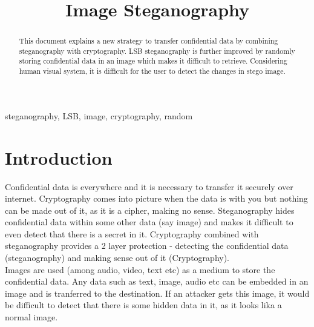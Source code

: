 \documentclass[conference]{IEEEtran}
\begin{document}
\title{Image Steganography\\
}

\author{
}

\maketitle

\begin{abstract}
This document explains a new strategy to transfer confidential data by combining steganography with cryptography.
LSB steganography is further improved by randomly storing confidential data in an image which makes it difficult to retrieve.
Considering human visual system, it is difficult for the user to detect the changes in stego image. \\
\end{abstract} 

\begin{IEEEkeywords}
steganography, LSB, image, cryptography, random
\end{IEEEkeywords}

\section{Introduction}
Confidential data is everywhere and it is necessary to transfer it securely over internet.
Cryptography comes into picture when the data is with you but nothing can be made out of it, as it is a cipher, making no sense.
Steganography hides confidential data within some other data (say image) and makes it difficult to even detect that there is a secret in it.
Cryptography combined with steganography provides a 2 layer protection - detecting the confidential data (steganography) and making sense out of it (Cryptography).\\

Images are used (among audio, video, text etc) as a medium to store the confidential data.
Any data such as text, image, audio etc can be embedded in an image and is tranferred to the destination.
If an attacker gets this image, it would be difficult to detect that there is some hidden data in it, as it looks lika a normal image.\\
\end{document}
